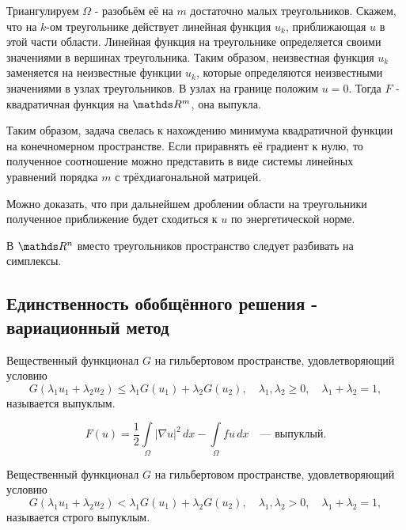 Триангулируем $\Omega$ - разобьём её на $m$ достаточно малых треугольников. Скажем, что на $k$-ом треугольнике действует линейная функция $u_k$, приближающая $u$ в этой части области. Линейная функция на треугольнике определяется своими значениями в вершинах треугольника. Таким образом, неизвестная функция $u_k$ заменяется на неизвестные функции $u_k$, которые определяются неизвестными значениями в узлах треугольников. В узлах на границе положим $u = 0$. Тогда $F$ - квадратичная функция на $\real^m$, она выпукла.

Таким образом, задача свелась к нахождению минимума квадратичной функции на конечномерном пространстве. Если приравнять её градиент к нулю, то полученное соотношение можно представить в виде системы линейных уравнений порядка $m$ с трёхдиагональной матрицей.

Можно доказать, что при дальнейшем дроблении области на треугольники полученное приближение будет сходиться к $u$ по энергетической норме.  

В $\real^n$ вместо треугольников пространство следует разбивать на симплексы.

\subsection{Единственность обобщённого решения - вариационный метод}

\begin{definition} Вещественный функционал $G$ на гильбертовом пространстве, удовлетворяющий условию
$$ G(\lambda_1 u_1 + \lambda_2 u_2) \leq \lambda_1 G(u_1) + \lambda_2 G(u_2), \quad \lambda_1,\lambda_2 \geq 0, \quad \lambda_1 + \lambda_2 = 1,$$
называется выпуклым.
\end{definition}

\begin{exercise}
$$ F(u) = \frac {1} {2} \int \limits_\Omega |\nabla u|^2 \, dx - \int \limits_\Omega fu \, dx \quad \text{--- выпуклый.}$$
\end{exercise}

\begin{definition} Вещественный функционал $G$ на гильбертовом пространстве, удовлетворяющий условию
$$ G(\lambda_1 u_1 + \lambda_2 u_2) < \lambda_1 G(u_1) + \lambda_2 G(u_2), \quad \lambda_1,\lambda_2 > 0, \quad \lambda_1 + \lambda_2 = 1,$$
называется строго выпуклым.
\end{definition}

